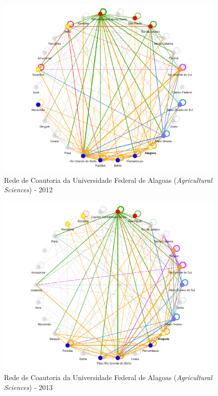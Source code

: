 \begin{figure}[H]
	\centering
	\includegraphics[scale=0.6]{Imagens/rede-agr-AL-2012.pdf}
	\caption{Rede de Coautoria da Universidade Federal de Alagoas (\textit{Agricultural Sciences}) - 2012}
	\label{Rede de Coautoria - UF AGRI AL 2012}
\end{figure}

\begin{figure}[H]
	\centering
	\includegraphics[scale=0.6]{Imagens/rede-agr-AL-2013.pdf}
	\caption{Rede de Coautoria da Universidade Federal de Alagoas (\textit{Agricultural Sciences}) - 2013}
	\label{Rede de Coautoria - UF AGRI AL 2013}
\end{figure}

